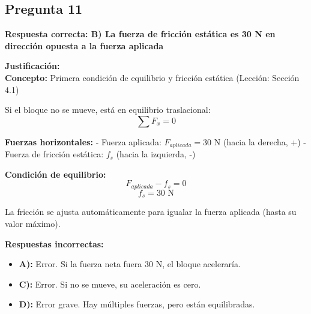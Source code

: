\newpage
\begin{respuestabox}
\subsection{Pregunta 11}
\textcolor{verdecorrecto}{\textbf{Respuesta correcta: B) La fuerza de fricción estática es 30 N en dirección opuesta a la fuerza aplicada}}

\textbf{Justificación:}\\
\textbf{Concepto:} Primera condición de equilibrio y fricción estática (Lección: Sección 4.1)

Si el bloque no se mueve, está en equilibrio traslacional:
$$\sum F_x = 0$$

\textbf{Fuerzas horizontales:}
- Fuerza aplicada: $F_{aplicada} = 30$ N (hacia la derecha, +)
- Fuerza de fricción estática: $f_s$ (hacia la izquierda, -)

\textbf{Condición de equilibrio:}
$$F_{aplicada} - f_s = 0$$
$$f_s = 30 \text{ N}$$

La fricción se ajusta automáticamente para igualar la fuerza aplicada (hasta su valor máximo).

\textbf{Respuestas incorrectas:}
\begin{itemize}
    \item \textbf{A):} Error. Si la fuerza neta fuera 30 N, el bloque aceleraría.
    \item \textbf{C):} Error. Si no se mueve, su aceleración es cero.
    \item \textbf{D):} Error grave. Hay múltiples fuerzas, pero están equilibradas.
\end{itemize}
\end{respuestabox}

